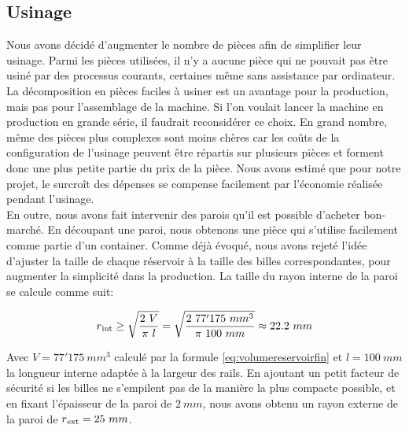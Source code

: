 \subsection{Usinage}
Nous avons décidé d'augmenter le nombre de pièces afin de simplifier leur usinage. Parmi les pièces utilisées, il n'y a aucune pièce qui ne pouvait pas être usiné par des processus courants, certaines même sans assistance par ordinateur. La décomposition en pièces faciles à usiner est un avantage pour la production, mais pas pour l'assemblage de la machine. Si l'on voulait lancer la machine en production en grande série, il faudrait reconsidérer ce choix. En grand nombre, même des pièces plus complexes sont moins chères car les coûts de la configuration de l'usinage peuvent être répartis sur plusieurs pièces et forment donc une plus petite partie du prix de la pièce. Nous avons estimé que pour notre projet, le surcroît des dépenses se compense facilement par l'économie réalisée pendant l'usinage.\\

En outre, nous avons fait intervenir des parois qu'il est possible d'acheter bon-marché. En découpant une paroi, nous obtenons une pièce qui s'utilise facilement comme partie d'un container. Comme déjà évoqué, nous avons rejeté l'idée d'ajuster la taille de chaque réservoir à la taille des billes correspondantes, pour augmenter la simplicité dans la production. La taille du rayon interne de la paroi se calcule comme suit: 

\begin{equation}r\textsubscript{int}\geq\sqrt{\frac{2\ V}{\pi\ l}}=\sqrt{\frac{2\ 77'175\ mm^3}{\pi\ 100\ mm}} \approx 22.2\ mm \label{eq:1}\end{equation}

Avec \(V=77'175\ mm^3\) calculé par la formule \ref{eq:volumereservoirfin} et \(l=100\ mm\) la longueur interne adaptée à la largeur des rails. En ajoutant un petit facteur de sécurité si les billes ne s'empilent pas de la manière la plus compacte possible, et en fixant l'épaisseur de la paroi de \(2\ mm \), nous avons obtenu un rayon externe de la paroi de \(r\textsubscript{ext}=25\ mm\).
